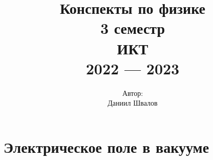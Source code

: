\documentclass[a4paper,12pt,oneside]{extarticle}
\title{
    Конспекты по физике \\
    \vspace{2cm} 3 семестр \\
    \vspace{2cm} ИКТ \\
    2022 — 2023
    \vfill
}
\author{
    Автор: \\
    Даниил Швалов
}
\date{}
\theoremstyle{numbered}
\theoremstyle{unnumbered}
\theoremstyle{named}
\theoremstyle{unnumbered}
\theoremstyle{named}
\theoremstyle{named}
\theoremstyle{named}
\begin{document}
\begin{titlepage}
    \pagestyle{empty}
    \cleardoublepage
    \maketitle
    \thispagestyle{empty}
\end{titlepage}

\setcounter{page}{2}
{
    \setcounter{tocdepth}{4}
    \hypersetup{linkcolor=black}
    \tableofcontents
    \newpage
}

\chapter{Электрическое поле в вакууме}%
\label{cha:Электрическое поле в вакууме}
\end{document}
